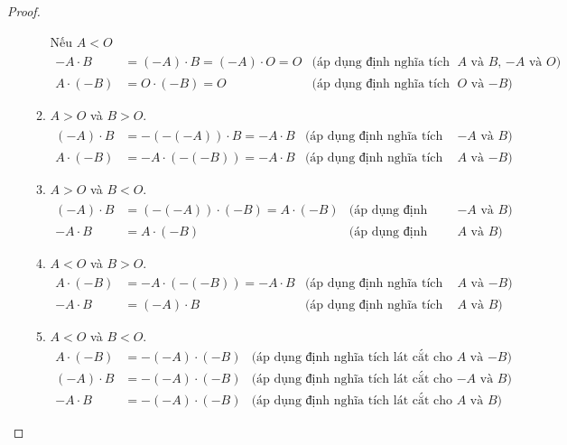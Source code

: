 \begin{proof}
\begin{enumerate}[label={(\roman*)}]
\begin{enumerate}[label={\textbf{Trường hợp \arabic*.}},itemindent=1cm]
                        Nếu $A < O$
                        \begin{align*}
                            -A\cdot B   & = (-A)\cdot B = (-A)\cdot O = O & \text{(áp dụng định nghĩa tích lát cắt cho $A$ và $B$, $-A$ và $O$)} \\
                            A\cdot (-B) & = O\cdot (-B) = O               & \text{(áp dụng định nghĩa tích lát cắt cho $O$ và $-B$)}
                        \end{align*}

                  \item $A > O$ và $B > O$.
                        \begin{align*}
                            (-A)\cdot B & = -(-(-A))\cdot B = -A\cdot B & \text{(áp dụng định nghĩa tích lát cắt cho $-A$ và $B$)} \\
                            A\cdot (-B) & = -A\cdot (-(-B)) = -A\cdot B & \text{(áp dụng định nghĩa tích lát cắt cho $A$ và $-B$)}
                        \end{align*}
                  \item $A > O$ và $B < O$.
                        \begin{align*}
                            (-A)\cdot B & = (-(-A))\cdot (-B) = A\cdot (-B) & \text{(áp dụng định nghĩa tích lát cắt cho $-A$ và $B$)} \\
                            -A\cdot B   & = A\cdot (-B)                     & \text{(áp dụng định nghĩa tích lát cắt cho $A$ và $B$)}
                        \end{align*}
                  \item $A < O$ và $B > O$.
                        \begin{align*}
                            A\cdot (-B) & = -A\cdot (-(-B)) = -A\cdot B & \text{(áp dụng định nghĩa tích lát cắt cho $A$ và $-B$)} \\
                            -A\cdot B   & = (-A)\cdot B                 & \text{(áp dụng định nghĩa tích lát cắt cho $A$ và $B$)}
                        \end{align*}
                  \item $A < O$ và $B < O$.
                        \begin{align*}
                            A\cdot (-B) & = -(-A)\cdot (-B) & \text{(áp dụng định nghĩa tích lát cắt cho $A$ và $-B$)} \\
                            (-A)\cdot B & = -(-A)\cdot (-B) & \text{(áp dụng định nghĩa tích lát cắt cho $-A$ và $B$)} \\
                            -A\cdot B   & = -(-A)\cdot (-B) & \text{(áp dụng định nghĩa tích lát cắt cho $A$ và $B$)}
                        \end{align*}
              \end{enumerate}


\end{enumerate}
\end{proof}
